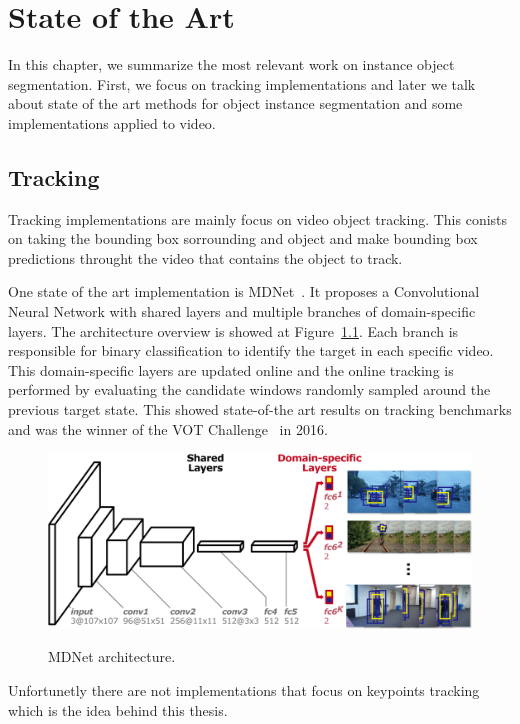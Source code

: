 
\chapter{State of the Art}
\label{cha:stateofart}

In this chapter, we summarize the most relevant work on instance object segmentation.
First, we focus on tracking implementations and later we talk about state of the art methods for object instance segmentation and some implementations applied to video.

\section{Tracking}
\label{sec:soa_tracking}

Tracking implementations are mainly focus on video object tracking.
This conists on taking the bounding box sorrounding and object and make bounding box predictions throught the video that contains the object to track.

One state of the art implementation is MDNet~\cite{nam2016learning}.
It proposes a Convolutional Neural Network with shared layers and multiple branches of domain-specific layers.
The architecture overview is showed at Figure~\ref{fig:mdnet}.
Each branch is responsible for binary classification to identify the target in each specific video.
This domain-specific layers are updated online and the online tracking is performed by evaluating the candidate windows randomly sampled around the previous target state.
This showed state-of-the art results on tracking benchmarks and was the winner of the VOT Challenge~\cite{VOT_TPAMI} in 2016.

\begin{figure}[h]
\centering
\includegraphics[width=.8\linewidth]{figures/mdnet/architecture.png}
\label{fig:mdnet}
\caption{MDNet architecture. }
\end{figure}

Unfortunetly there are not implementations that focus on keypoints tracking which is the idea behind this thesis.

